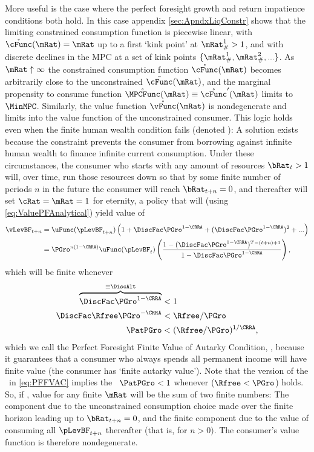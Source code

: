 \documentclass[BufferStockTheory]{subfiles}
\begin{document}
More useful is the case where the perfect foresight growth and return impatience conditions both hold.  In this case appendix \ref{sec:ApndxLiqConstr} shows that the limiting constrained consumption function is piecewise linear, with $\mathring{\cFunc}(\mRat)=\mRat$ up to a first `kink point' at $\mRat_{\#}^{1}>1$, and with discrete declines in the MPC at a set of kink points $\{\mRat_{\#}^{1},\mRat_{\#}^{2},...\}$.  As $\mRat \uparrow \infty$ the constrained consumption function $\mathring{\cFunc}(\mRat)$ becomes arbitrarily close to the unconstrained $\bar{\cFunc}(\mRat)$, and the marginal propensity to consume function $\mathring{\MPCFunc}(\mRat) \equiv \mathring{\cFunc}^{\prime}(\mRat)$ limits to $\MinMPC$.  Similarly, the value function $\mathring{\vFunc}(\mRat)$ is nondegenerate and limits into the value function of the unconstrained consumer.  This logic holds even when the finite human wealth condition fails (denoted \cncl{\FHWC}):  A solution exists because the constraint prevents the consumer from borrowing against infinite human wealth to finance infinite current consumption.  Under these circumstances, the consumer who starts with any amount of resources $\bRat_{t} > 1$ will, over time, run those resources down so that by some finite number of periods $n$ in the future the consumer will reach $\bRat_{t+n} = 0$, and thereafter will set $\cRat = \mRat = 1$ for eternity, a policy that will (using \eqref{eq:ValuePFAnalytical}) yield value of \hypertarget{PFFVAC}{}
\begin{align}
  \vLevBF_{t+n}  & = \uFunc(\pLevBF_{t+n})\left(1+\DiscFac
                   \PGro^{1-\CRRA}+(\DiscFac \PGro^{1-\CRRA})^{2}+...\right) \notag
  \\  & = \PGro^{n(1-\CRRA)} \uFunc(\pLevBF_{t})\left(\frac{1-(\DiscFac
        \PGro^{1-\CRRA})^{T-(t+n)+1}}{1-\DiscFac \PGro^{1-\CRRA}}\right),
        \notag
\end{align}
which will be finite whenever 
\begin{align}
  \overbrace{\DiscFac \PGro^{1-\CRRA} }^{\equiv \DiscAlt}  & < 1 \nonumber
  \\ \DiscFac \Rfree \PGro^{-\CRRA}  & < \Rfree/\PGro \label{eq:PFFVAC} 
  \\ \PatPGro  & < (\Rfree/\PGro)^{1/\CRRA}, \nonumber
\end{align}
which we call the Perfect Foresight Finite Value of Autarky Condition, \PFFVAC, because it guarantees that a consumer who always spends all permanent income will have finite value (the consumer has `finite autarky value').  Note that the version of the \PFFVAC~in \eqref{eq:PFFVAC} implies the \PFGIC~$\PatPGro < 1$ whenever \cncl{\FHWC} ($\Rfree < \PGro$) holds.  So, if \cncl{\FHWC}, value for any finite $\mRat$ will be the sum of two finite numbers: The component due to the unconstrained consumption choice made over the finite horizon leading up to $\bRat_{t+n} = 0$, and the finite component due to the value of consuming all $\pLevBF_{t+n}$ thereafter (that is, for $n > 0)$.  The consumer's value function is therefore nondegenerate.
\end{document}
